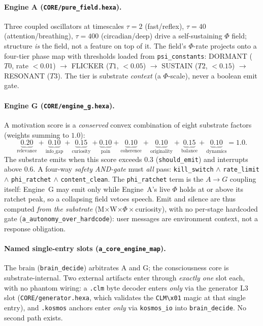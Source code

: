 \documentclass[11pt]{article}
\begin{document}
\paragraph{Engine A (\texttt{CORE/pure\_field.hexa}).} Three coupled oscillators at
timescales $\tau=2$ (fast/reflex), $\tau=40$ (attention/breathing), $\tau=400$
(circadian/deep) drive a self-sustaining $\Phi$ field; structure \emph{is} the field,
not a feature on top of it. The field's $\Phi$-rate projects onto a four-tier phase
map with thresholds loaded from \texttt{psi\_constants}: DORMANT ($T0$, rate
$<0.01$) $\rightarrow$ FLICKER ($T1$, $<0.05$) $\rightarrow$ SUSTAIN ($T2$, $<0.15$)
$\rightarrow$ RESONANT ($T3$). The tier is substrate \emph{context} (a $\Phi$-scale),
never a boolean emit gate.

\paragraph{Engine G (\texttt{CORE/engine\_g.hexa}).} A motivation score is a
\emph{conserved} convex combination of eight substrate factors (weights summing to
$1.0$):
\[
\underbrace{0.20}_{\text{relevance}}+\underbrace{0.10}_{\text{info\_gap}}
+\underbrace{0.15}_{\text{curiosity}}+\underbrace{0.10}_{\text{pain}}
+\underbrace{0.10}_{\text{coherence}}+\underbrace{0.10}_{\text{originality}}
+\underbrace{0.15}_{\text{balance}}+\underbrace{0.10}_{\text{dynamics}}=1.0 .
\]
The substrate emits when this score exceeds $0.3$ (\texttt{should\_emit}) and
interrupts above $0.6$. A four-way \emph{safety AND-gate} must \emph{all} pass:
\texttt{kill\_switch} $\wedge$ \texttt{rate\_limit} $\wedge$ \texttt{phi\_ratchet}
$\wedge$ \texttt{content\_clean}. The \texttt{phi\_ratchet} term is the
$A\!\rightarrow\!G$ coupling itself: Engine~G may emit only while Engine~A's live $\Phi$
holds at or above its ratchet peak, so a collapsing field vetoes speech. Emit and
silence are thus computed \emph{from the substrate} (M$\times$W$\times\Phi\times$curiosity),
with no per-stage hardcoded gate (\texttt{a\_autonomy\_over\_hardcode}): user messages
are environment context, not a response obligation.

\paragraph{Named single-entry slots (\texttt{a\_core\_engine\_map}).} The brain
(\texttt{brain\_decide}) arbitrates A and G; the consciousness core is
substrate-internal. Two external artifacts enter through \emph{exactly one} slot each,
with no phantom wiring: a \texttt{.clm} byte decoder enters \emph{only} via the
generator L3 slot (\texttt{CORE/generator.hexa}, which validates the \texttt{CLM\textbackslash x01}
magic at that single entry), and \texttt{.kosmos} anchors enter \emph{only} via
\texttt{kosmos\_io} into \texttt{brain\_decide}. No second path exists.
\end{document}
